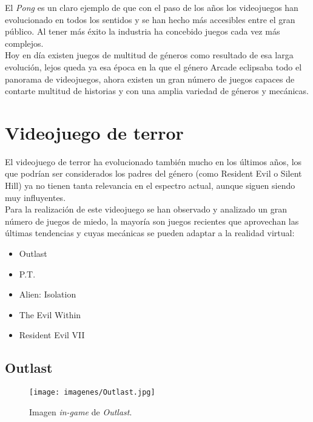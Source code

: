 El \textit{Pong} es un claro ejemplo de que con el paso de los años los videojuegos han evolucionado en todos los sentidos y se han hecho más accesibles entre el gran público. Al tener más éxito la industria ha concebido juegos cada vez más complejos.
\\

Hoy en día existen juegos de multitud de géneros como resultado de esa larga evolución, lejos queda ya esa época en la que el género Arcade eclipsaba todo el panorama de videojuegos, ahora existen un gran número de juegos capaces de contarte multitud de historias y con una amplia variedad de géneros y mecánicas.
\\


\section{Videojuego de terror}

El videojuego de terror ha evolucionado también mucho en los últimos años, los que podrían ser considerados los padres del género (como Resident Evil o Silent Hill) ya no tienen tanta relevancia en el espectro actual, aunque siguen siendo muy influyentes. 
\\

Para la realización de este videojuego se han observado y analizado un gran número de juegos de miedo, la mayoría son juegos recientes que aprovechan las últimas tendencias y cuyas mecánicas se pueden adaptar a la realidad virtual:

\begin{itemize}
	\item Outlast
	\item P.T.
	\item Alien: Isolation
	\item The Evil Within
	\item Resident Evil VII
\end{itemize}

\subsection{Outlast}

\begin{figure}
	\begin{center}
		\texttt{[image: imagenes/Outlast.jpg]}
		\caption{Imagen \textit{in-game} de \textit{Outlast}.}
		\label{outlast}
	\end{center}
\end{figure}

